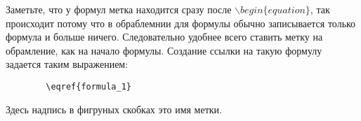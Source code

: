     Заметьте, что у формул метка находится сразу после $\backslash begin\{equation\}$, так происходит потому что в обраблемнии для формулы обычно записывается только формула и больше ничего. Следовательно удобнее всего ставить метку на обрамление, как на начало формулы. Создание ссылки на такую формулу задается таким выражением:
    
    \begin{verbatim}
        \eqref{formula_1}
    \end{verbatim}
    
    Здесь надпись в фигруных скобках это имя метки.
    
